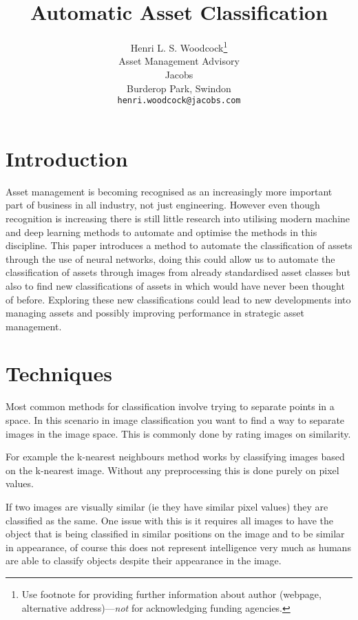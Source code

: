 \documentclass{article}
\title{Automatic Asset Classification}
\author{
  Henri L. S. Woodcock\thanks{Use footnote for providing further
    information about author (webpage, alternative
    address)---\emph{not} for acknowledging funding agencies.} \\
  Asset Management Advisory\\
  Jacobs\\
  Burderop Park, Swindon \\
  \texttt{henri.woodcock@jacobs.com} \\
}
\begin{document}
\maketitle

\begin{abstract}
\lipsum[1]
\end{abstract}




\section{Introduction}
Asset management is becoming recognised as an increasingly more important part of business in all industry, not just engineering. However even though recognition is increasing there is still little research into utilising modern machine and deep learning methods to automate and optimise the methods in this discipline. This paper introduces a method to automate the classification of assets through the use of neural networks, doing this could allow us to automate the classification of assets through images from already standardised asset classes but also to find new classifications of assets in which would have never been thought of before. Exploring these new classifications could lead to new developments into managing assets and possibly improving performance in strategic asset management.

\section{Techniques}
\label{sec: techniques}
Most common methods for classification involve trying to separate points in a space. In this scenario in image classification you want to find a way to separate images in the image space. This is commonly done by rating images on similarity.

For example the k-nearest neighbours method works by classifying images based on the k-nearest image. Without any preprocessing this is done purely on pixel values.

If two images are visually similar (ie they have similar pixel values) they are classified as the same. One issue with this is it requires all images to have the object that is being classified in similar positions on the image and to be similar in appearance, of course this does not represent intelligence very much as humans are able to classify objects despite their appearance in the image.
\end{document}
